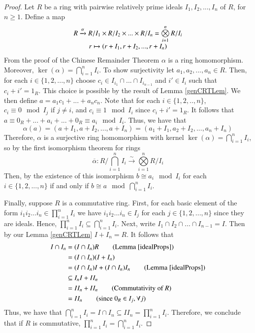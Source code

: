 \documentclass[12pt, a4paper, oneside, openright, titlepage]{book}
\begin{document}
\begin{proof}
    Let $R$ be a ring with pairwise relatively prime ideals $I_1,I_2,...,I_n$ of $R$, for $n \geq 1$. Define a map $$\begin{array}{c} R\xrightarrow{\alpha} R/I_1 \times R/I_2 \times ... \times R/I_n = \bigotimes\limits_{i=1}^nR/I_i \\ r \mapsto (r+I_1, r+I_2,...,r+I_n) \end{array}$$
    From the proof of the Chinese Remainder Theorem $\alpha$ is a ring homomorphism. Moreover, $\ker(\alpha) = \bigcap\limits_{i=1}^nI_i$. To show surjectivity let $a_1,a_2,...,a_n \in R$. Then, for each $i \in \{1,2,...,n\}$ choose $c_i \in I_{i_1}\cap ... \cap I_{i_{n-1}}$ and $i' \in I_i$ such that $c_i + i' = 1_R$. This choice is possible by the result of Lemma \ref{genCRTLem}. We then define $a = a_1c_1 + ... + a_nc_n$. Note that for each $i \in \{1,2,..,n\}$, $c_i \equiv 0 \mod I_j$ if $j \neq i$, and $c_i \equiv 1 \mod I_i$ since $c_i + i' = 1_R$. It follows that $a \equiv 0_R + ... + a_i + ... + 0_R \equiv a_i \mod I_i$. Thus, we have that $$\alpha(a) = (a+I_1,a+I_2,...,a+I_n) = (a_1+I_1,a_2+I_2,...,a_n+I_n)$$ 
    Therefore, $\alpha$ is a surjective ring homomorphism with kernel $\ker(\alpha) = \bigcap\limits_{i=1}^nI_i$, so by the first isomorphism theorem for rings $$\overline{\alpha}: R/\bigcap\limits_{i=1}^n I_i \xrightarrow{\sim} \bigotimes\limits_{i=1}^nR/I_i$$
    Then, by the existence of this isomorphism $b \cong a_i \mod I_i$ for each $i \in \{1,2,...,n\}$ if and only if $b \cong a \mod \bigcap\limits_{i=1}^n I_i$. 
    
    
    Finally, suppose $R$ is a commutative ring. First, for each basic element of the form $i_1i_2...i_n \in \prod\limits_{i=1}^n I_i$ we have $i_1i_2...i_n \in I_j$ for each $j \in \{1,2,...,n\}$ since they are ideals. Hence, $\prod\limits_{i=1}^n I_i \subseteq \bigcap\limits_{i=1}^n I_i$. Next, write $I_1\cap I_2 \cap ... \cap I_{n-1} = I$. Then by our Lemma \ref{genCRTLem} $I + I_n = R$. It follows that \begin{align*}
        I \cap I_n &= (I \cap I_n)R \tag{Lemma \ref{idealProps}}\\
        &= (I\cap I_n)(I+I_n) \\
        &= (I\cap I_n)I + (I\cap I_n)I_n \tag{Lemma \ref{idealProps}} \\
        &\subseteq I_nI + II_n  \\
        &= II_n + II_n \tag{Commutativity of $R$} \\
        &= II_n \tag{since $0_R \in I_j, \forall j$} 
    \end{align*}
    Thus, we have that $\bigcap\limits_{i=1}^n I_i = I \cap I_n \subseteq II_n = \prod\limits_{i=1}^n I_i$. Therefore, we conclude that if $R$ is commutative, $\prod\limits_{i=1}^n I_i = \bigcap\limits_{i=1}^n I_i$.
\end{proof}
\end{document}
